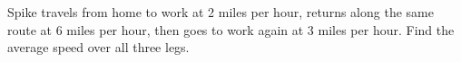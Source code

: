Spike travels from home to work at 2 miles per hour, returns along the same route at 6 miles per hour, then goes to work again at 3 miles per hour. Find the average speed over all three legs.
